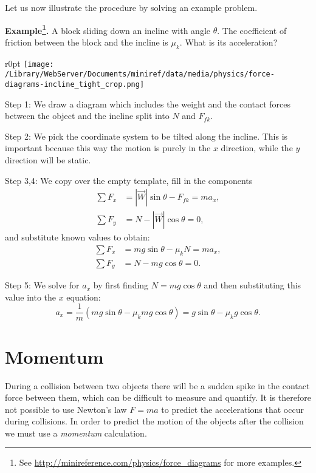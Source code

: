 \documentclass[letterpaper,9pt,journal]{IEEEtran}
\newcommand{\dokuitalic}[1]{\textsl{#1}}
\begin{document}
Let us now illustrate the procedure by solving an example problem.

{\bf Example\footnote{See \url{http://minireference.com/physics/force_diagrams} for more examples.}. }
A block sliding down an incline with angle $\theta$. The coefficient of friction between the block and the incline is  $\mu_k$.
What is its acceleration?

\begin{wrapfigure}{r}{0pt}
\centering
\texttt{[image: /Library/WebServer/Documents/miniref/data/media/physics/force-diagrams-incline\_tight\_crop.png]}
\end{wrapfigure}

Step 1: We draw a diagram which includes the weight and the contact forces between the object and the incline split into $N$ and $F_{fk}$.

Step 2: We pick the coordinate system to be tilted along the incline. This is important because this way the motion is purely  in the $x$ direction,
while the $y$ direction will be static.


Step 3,4: We copy over the empty template, fill in the components
\begin{align*}
 \sum F_x  &= |\vec{W}|\sin\theta - F_{fk}  = ma_x, \\
 \sum F_y &= N - |\vec{W}|\cos\theta  = 0, 
\end{align*}
and substitute known values to obtain:
\begin{align*}
 \sum F_x &= mg\sin\theta - \mu_kN  = ma_x, \\
 \sum F_y &= N - mg\cos\theta  = 0. 
\end{align*}

Step 5: We solve for $a_x$ by first finding $N=mg\cos\theta$ and then substituting this
value into the $x$ equation:
\[
 a_x 
 = \frac{1}{m}\left( mg\sin\theta - \mu_k mg\cos\theta \right)
 = g\sin\theta - \mu_k g\cos\theta.
\]




\section{Momentum}

During a collision between two objects there will be a sudden spike in the contact force between them,
which can be difficult to measure and quantify. 
It is therefore not possible to use Newton's law $F=ma$ to predict the accelerations that occur during collisions.
In order to predict the motion of the objects after the collision we must use a \dokuitalic{momentum} calculation.
\end{document}
